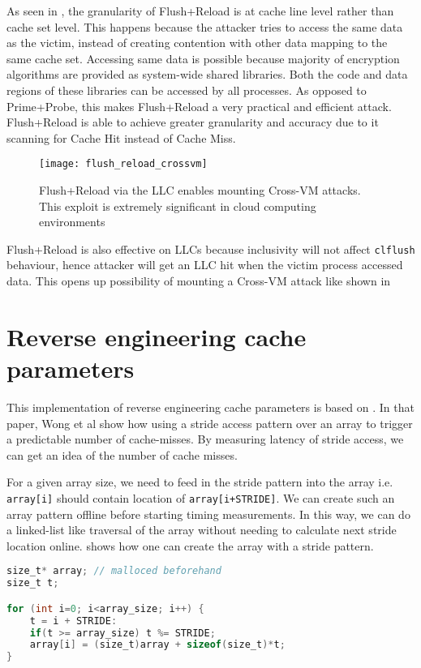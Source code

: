 As seen in , the granularity of Flush+Reload is at cache line
level rather than cache set level. This happens because the attacker tries to
access the same data as the victim, instead of creating contention with other
data mapping to the same cache set. Accessing same data is possible because
majority of encryption algorithms are provided as system-wide shared
libraries. Both the code and data regions of these libraries can be accessed
by all processes. As opposed to Prime+Probe, this makes Flush+Reload a very
practical and efficient attack. Flush+Reload is able to achieve greater
granularity and accuracy due to it scanning for Cache Hit instead of Cache Miss.

\begin{figure}[h]
\centering
\texttt{[image: flush\_reload\_crossvm]}
\caption[Cross-VM Flush+Reload]{Flush+Reload via the LLC enables mounting Cross-VM attacks. This exploit is extremely significant in cloud computing environments}
\label{fig:crossvm}
\end{figure}

Flush+Reload is also effective on LLCs because inclusivity will not affect
\texttt{clflush} behaviour, hence attacker will get an LLC hit when the victim
process accessed data. This opens up possibility of mounting a Cross-VM attack
 like shown in 

\section{Reverse engineering cache parameters}

This implementation of reverse engineering cache parameters is based on
. In that paper, Wong et al show how using a stride
access pattern over an array to trigger a predictable number of cache-misses.
By measuring latency of stride access, we can get an idea of the number of cache misses.

For a given array size, we need to feed in the stride pattern into the array
i.e. \texttt{array[i]} should contain location of \texttt{array[i+STRIDE]}. We can create such an
array pattern offline before starting timing measurements. In this way, we can
do a linked-list like traversal of the array without needing to calculate next
stride location online.  shows how one can create the
array with a stride pattern.

\begin{lstlisting}[label={lst:offline},caption={Offline
formation of array with stride access pattern},language={C}]
size_t* array; // malloced beforehand
size_t t;

for (int i=0; i<array_size; i++) {
    t = i + STRIDE:
    if(t >= array_size) t %= STRIDE;
    array[i] = (size_t)array + sizeof(size_t)*t;
}
\end{lstlisting}

